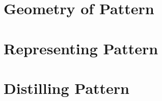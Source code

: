 \documentclass{../sharedAssets/tufte}
\begin{document}
\part{Geometry of Pattern}











\part{Representing Pattern}










\part{Distilling Pattern}






\end{document}
